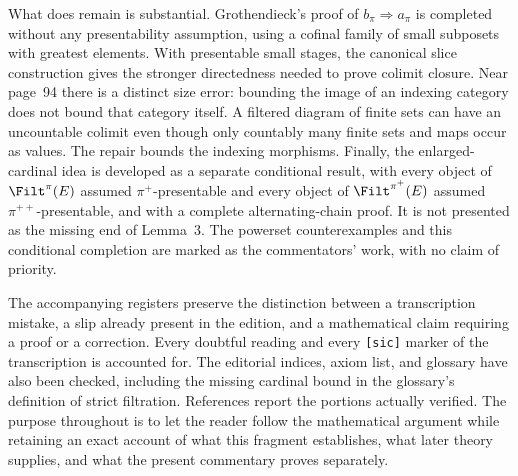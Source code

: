 What does remain is substantial. Grothendieck's proof of $b_\pi\Rightarrow a_\pi$ is completed without any presentability assumption, using a cofinal family of small subposets with greatest elements. With presentable small stages, the canonical slice construction gives the stronger directedness needed to prove colimit closure. Near page~94 there is a distinct size error: bounding the image of an indexing category does not bound that category itself. A filtered diagram of finite sets can have an uncountable colimit even though only countably many finite sets and maps occur as values. The repair bounds the indexing morphisms. Finally, the enlarged-cardinal idea is developed as a separate conditional result, with every object of $\Filt^\pi(E)$ assumed $\pi^+$-presentable and every object of $\Filt^{\pi^+}(E)$ assumed $\pi^{++}$-presentable, and with a complete alternating-chain proof. It is not presented as the missing end of Lemma~3. The powerset counterexamples and this conditional completion are marked as the commentators' work, with no claim of priority.

The accompanying registers preserve the distinction between a transcription mistake, a slip already present in the edition, and a mathematical claim requiring a proof or a correction. Every doubtful reading and every \texttt{[sic]} marker of the transcription is accounted for. The editorial indices, axiom list, and glossary have also been checked, including the missing cardinal bound in the glossary's definition of strict filtration. References report the portions actually verified. The purpose throughout is to let the reader follow the mathematical argument while retaining an exact account of what this fragment establishes, what later theory supplies, and what the present commentary proves separately.
